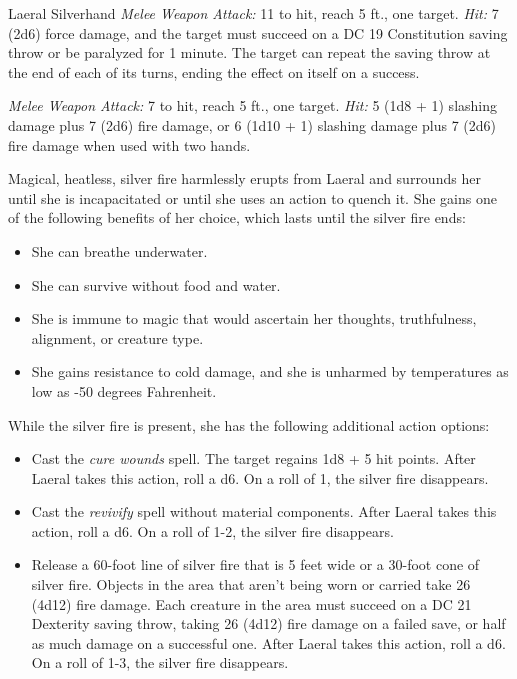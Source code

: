 \documentclass[10pt,a4paper,twoside,bg=print,twocolumn,openany,nodeprecatedcode]{dndbook}
\begin{document}
\begin{DndMonster}[float=t]{Laeral Silverhand}
\textsl{Melee Weapon Attack:} 11 to hit, reach 5 ft., one target. \textsl{Hit:} 7 (2d6) force damage, and the target must succeed on a DC 19 Constitution saving throw or be paralyzed for 1 minute. The target can repeat the saving throw at the end of each of its turns, ending the effect on itself on a success.

\textsl{Melee Weapon Attack:} 7 to hit, reach 5 ft., one target. \textsl{Hit:} 5 (1d8 + 1) slashing damage plus 7 (2d6) fire damage, or 6 (1d10 + 1) slashing damage plus 7 (2d6) fire damage when used with two hands.

Magical, heatless, silver fire harmlessly erupts from Laeral and surrounds her until she is incapacitated or until she uses an action to quench it. She gains one of the following benefits of her choice, which lasts until the silver fire ends:


\begin{itemize}
\item She can breathe underwater.
\item She can survive without food and water.
\item She is immune to magic that would ascertain her thoughts, truthfulness, alignment, or creature type.
\item She gains resistance to cold damage, and she is unharmed by temperatures as low as -50 degrees Fahrenheit.
\end{itemize}

While the silver fire is present, she has the following additional action options:


\begin{itemize}
\item Cast the \textit{cure wounds} spell. The target regains 1d8 + 5 hit points. After Laeral takes this action, roll a d6. On a roll of 1, the silver fire disappears.
\item Cast the \textit{revivify} spell without material components. After Laeral takes this action, roll a d6. On a roll of 1-2, the silver fire disappears.
\item Release a 60-foot line of silver fire that is 5 feet wide or a 30-foot cone of silver fire. Objects in the area that aren't being worn or carried take 26 (4d12) fire damage. Each creature in the area must succeed on a DC 21 Dexterity saving throw, taking 26 (4d12) fire damage on a failed save, or half as much damage on a successful one. After Laeral takes this action, roll a d6. On a roll of 1-3, the silver fire disappears.
\end{itemize}

\end{DndMonster}
\end{document}
